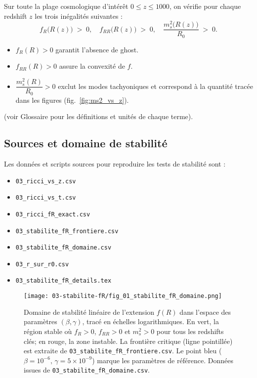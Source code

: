 Sur toute la plage cosmologique d’intérêt \(0 \le z \le 1000\), on vérifie pour chaque redshift \(z\) les trois inégalités suivantes :
\[
  f_{R}\bigl(R(z)\bigr) \;>\; 0,
  \quad
  f_{RR}\bigl(R(z)\bigr) \;>\; 0,
  \quad
  \frac{m_{s}^{2}\bigl(R(z)\bigr)}{R_{0}} \;>\; 0.
\]
\begin{itemize}
  \item \(f_{R}(R)>0\) garantit l’absence de ghost.
  \item \(f_{RR}(R)>0\) assure la convexité de \(f\).
  \item \(\dfrac{m_{s}^{2}(R)}{R_{0}}>0\) exclut les modes tachyoniques et correspond à la quantité tracée dans les figures (fig.~\ref{fig:ms2_vs_z}).
\end{itemize}
(voir Glossaire pour les définitions et unités de chaque terme).

\subsection{Sources et domaine de stabilité}

Les données et scripts sources pour reproduire les tests de stabilité sont :
\begin{itemize}
  \item \texttt{03\_ricci\_vs\_z.csv} %
  \item \texttt{03\_ricci\_vs\_t.csv}  %
  \item \texttt{03\_ricci\_fR\_exact.csv}
  \item \texttt{03\_stabilite\_fR\_frontiere.csv}
  \item \texttt{03\_stabilite\_fR\_domaine.csv}
  \item \texttt{03\_r\_sur\_r0.csv} %
  \item \texttt{03\_stabilite\_fR\_details.tex}
\end{itemize}

\begin{figure}[htbp]
  \centering
  \texttt{[image: 03-stabilite-fR/fig\_01\_stabilite\_fR\_domaine.png]}
  \caption{Domaine de stabilité linéaire de l’extension \(f(R)\) dans l’espace des paramètres \((\beta,\gamma)\), tracé en échelles logarithmiques.
    En vert, la région stable où \(f_R>0\), \(f_{RR}>0\) et \(m_s^2>0\) pour tous les redshifts clés; en rouge, la zone instable.
    La frontière critique (ligne pointillée) est extraite de \texttt{03\_stabilite\_fR\_frontiere.csv}.
    Le point bleu (\(\beta=10^{-6},\,\gamma=5\times10^{-9}\)) marque les paramètres de référence.
    Données issues de \texttt{03\_stabilite\_fR\_domaine.csv}.}
  \label{fig:stabilite_fR_domaine}
\end{figure}

